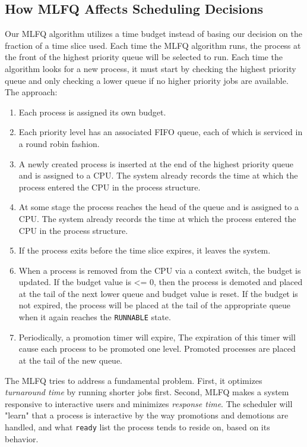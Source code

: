 \documentclass[11pt,letterpaper]{report}
\begin{document}
	\subsection{How MLFQ Affects Scheduling Decisions}
	Our MLFQ algorithm utilizes a time budget instead of basing our decision on the fraction of a time slice used. Each time the MLFQ algorithm runs, the process at the front of the highest priority queue will be selected to run. Each time the algorithm looks for a new process, it must start by checking the highest priority queue and only checking a lower queue if no higher priority jobs are available.
	The approach:
	\begin{enumerate}
		\item Each process is assigned its own budget.
		\item Each priority level has an associated FIFO queue, each of which is serviced in a round robin fashion.
		\item A newly created process is inserted at the end of the highest priority queue and is assigned to a CPU. The system already records the time at which the process entered the CPU in the process structure.
		\item At some stage the process reaches the head of the queue and is assigned to a CPU. The system already records the time at which the process entered the CPU in the process structure.
		\item If the process exits before the time slice expires, it leaves the system.
		\item When a process is removed from the CPU via a context switch, the budget is updated. If the budget value is <= 0, then the process is demoted and placed at the tail of the next lower queue and budget value is reset. If the budget is not expired, the process will be placed at the tail of the appropriate queue when it again reaches the {\tt RUNNABLE} state.
		\item Periodically, a promotion timer will expire, The expiration of this timer will cause each process to be promoted one level. Promoted processes are placed at the tail of the new queue.
	\end{enumerate}
	
	The MLFQ tries to address a fundamental problem. First, it optimizes \emph{turnaround time} by running shorter jobs first. Second, MLFQ makes a system responsive to interactive users and minimizes \emph{response time}. The scheduler will "learn" that a process is interactive by the way promotions and demotions are handled, and what {\tt ready} list the process tends to reside on, based on its behavior.
	
\end{document}
